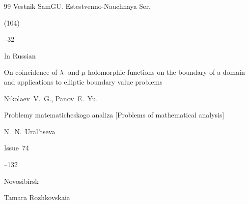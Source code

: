 \begin{thebibliography}{99}
\jour Vestnik SamGU. Estestvenno-Nauchnaya Ser.


(104)

--32




\lang In Russian

\paper On coincidence of $\lambda$- and $\mu$-holomorphic functions on the boundary of a domain and applications to elliptic boundary value problems

\by   Nikolaev~V.~G., Panov~E.~Yu.

\inbook Problemy matematicheskogo  analiza \rm [Problems of mathematical analysis]

\eds N.~N.~Ural'tseva


\volinfo Issue~74

--132

\publaddr Novosibirsk 

\publ Tamara Rozhkovskaia







\end{thebibliography}



\EngDate

\Russian

\newpage





%

%

